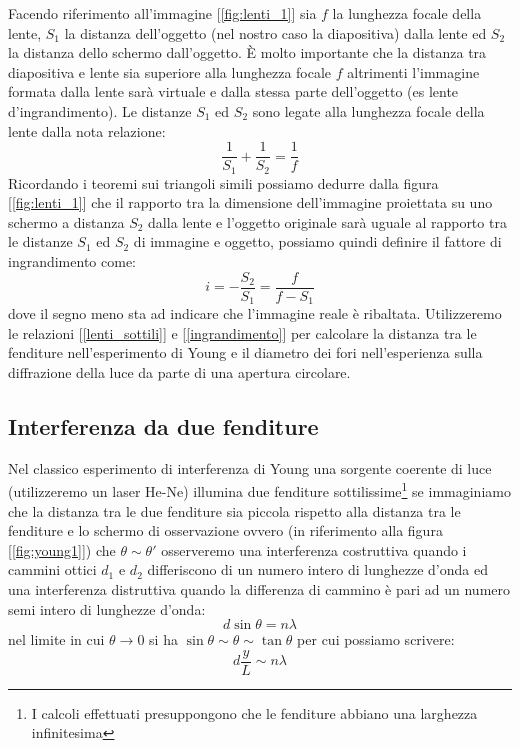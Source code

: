 \documentclass[a4paper,10pt,oneside]{article}
\begin{document}
Facendo riferimento all'immagine [\ref{fig:lenti_1}] sia $f$ la lunghezza focale della lente, $S_1$ la distanza dell'oggetto (nel nostro caso la diapositiva) dalla lente ed $S_2$ la distanza dello schermo dall'oggetto. È molto importante che la distanza tra diapositiva e lente sia superiore alla lunghezza focale $f$ altrimenti l'immagine formata dalla lente sarà virtuale e dalla stessa parte dell'oggetto (es lente d'ingrandimento). Le distanze $S_1$ ed $S_2$ sono legate alla lunghezza focale della lente dalla nota relazione:
\begin{equation}\label{lenti_sottili}
 \frac{1}{S_1}+\frac{1}{S_2}=\frac{1}{f}
\end{equation}
Ricordando i teoremi sui triangoli simili possiamo dedurre dalla figura [\ref{fig:lenti_1}] che il rapporto tra la dimensione dell'immagine proiettata su uno schermo a distanza $S_2$ dalla lente e l'oggetto originale sarà uguale al rapporto tra le distanze $S_1$ ed $S_2$ di immagine e oggetto, possiamo quindi definire il fattore di ingrandimento come:
\begin{equation}\label{ingrandimento}
 i=-\frac{S_2}{S_1}=\frac{f}{f-S_1}
\end{equation}
dove il segno meno sta ad indicare che l'immagine reale è ribaltata. Utilizzeremo le relazioni [\ref{lenti_sottili}] e [\ref{ingrandimento}] per calcolare la distanza tra le fenditure nell'esperimento di Young e il diametro dei fori nell'esperienza sulla diffrazione della luce da parte di una apertura circolare.

\subsection*{Interferenza da due fenditure}

Nel classico esperimento di  interferenza di Young una sorgente coerente di luce (utilizzeremo un laser He-Ne) illumina due fenditure sottilissime\footnote{I calcoli  effettuati presuppongono che le fenditure abbiano una larghezza infinitesima} se immaginiamo che la distanza tra le due fenditure sia piccola rispetto alla distanza tra le fenditure e lo schermo di osservazione  ovvero (in riferimento alla figura [\ref{fig:young1}]) che $\theta \sim \theta '$ osserveremo una interferenza costruttiva quando i cammini ottici $d_1$ e $d_2$ differiscono di un numero intero di lunghezze d'onda ed una interferenza distruttiva quando la differenza di cammino è pari ad un numero semi intero di lunghezze d'onda:
\begin{equation}
 d\sin \theta=n\lambda
\end{equation}
nel limite in cui $\theta \to 0$ si ha $\sin \theta \sim \theta \sim \tan \theta$ per cui possiamo scrivere:
\begin{equation}
 d\frac{y}{L}\sim n\lambda
\end{equation}
\end{document}
